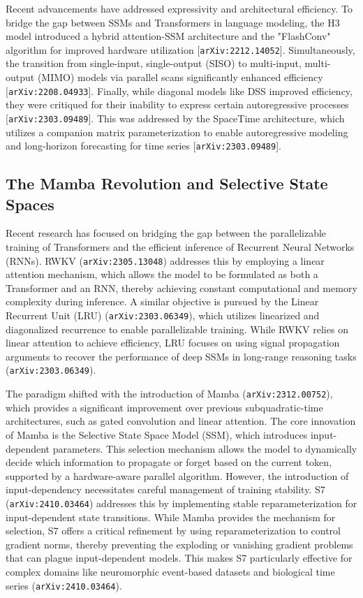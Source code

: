 \documentclass[11pt]{article}
\begin{document}
Recent advancements have addressed expressivity and architectural efficiency. To bridge the gap between SSMs and Transformers in language modeling, the H3 model introduced a hybrid attention-SSM architecture and the "FlashConv" algorithm for improved hardware utilization [\texttt{arXiv:2212.14052}]. Simultaneously, the transition from single-input, single-output (SISO) to multi-input, multi-output (MIMO) models via parallel scans significantly enhanced efficiency [\texttt{arXiv:2208.04933}]. Finally, while diagonal models like DSS improved efficiency, they were critiqued for their inability to express certain autoregressive processes [\texttt{arXiv:2303.09489}]. This was addressed by the SpaceTime architecture, which utilizes a companion matrix parameterization to enable autoregressive modeling and long-horizon forecasting for time series [\texttt{arXiv:2303.09489}].

\subsection{The Mamba Revolution and Selective State Spaces}

Recent research has focused on bridging the gap between the parallelizable training of Transformers and the efficient inference of Recurrent Neural Networks (RNNs). RWKV (\texttt{arXiv:2305.13048}) addresses this by employing a linear attention mechanism, which allows the model to be formulated as both a Transformer and an RNN, thereby achieving constant computational and memory complexity during inference. A similar objective is pursued by the Linear Recurrent Unit (LRU) (\texttt{arXiv:2303.06349}), which utilizes linearized and diagonalized recurrence to enable parallelizable training. While RWKV relies on linear attention to achieve efficiency, LRU focuses on using signal propagation arguments to recover the performance of deep SSMs in long-range reasoning tasks (\texttt{arXiv:2303.06349}).

The paradigm shifted with the introduction of Mamba (\texttt{arXiv:2312.00752}), which provides a significant improvement over previous subquadratic-time architectures, such as gated convolution and linear attention. The core innovation of Mamba is the Selective State Space Model (SSM), which introduces input-dependent parameters. This selection mechanism allows the model to dynamically decide which information to propagate or forget based on the current token, supported by a hardware-aware parallel algorithm. However, the introduction of input-dependency necessitates careful management of training stability. S7 (\texttt{arXiv:2410.03464}) addresses this by implementing stable reparameterization for input-dependent state transitions. While Mamba provides the mechanism for selection, S7 offers a critical refinement by using reparameterization to control gradient norms, thereby preventing the exploding or vanishing gradient problems that can plague input-dependent models. This makes S7 particularly effective for complex domains like neuromorphic event-based datasets and biological time series (\texttt{arXiv:2410.03464}).
\end{document}
